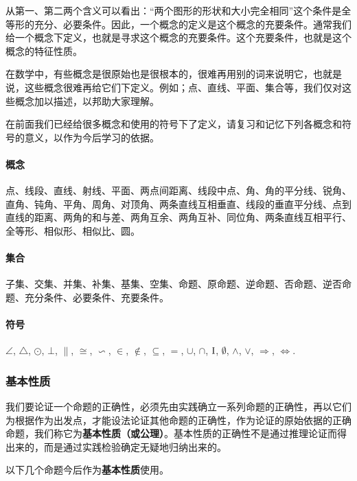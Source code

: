 从第一、第二两个含义可以看出：“两个图形的形状和大小完全相同”这个条件是全等形的充分、必要条件。因此，一个概念的定义是这个概念的充要条件。通常我们给一个概念下定义，也就是寻求这个概念的充要条件。这个充要条件，也就是这个概念的特征性质。

在数学中，有些概念是很原始也是很根本的，很难再用别的词来说明它，也就是说，这些概念很难再给它们下定义。例如；点、直线、平面、集合等，我们仅对这些概念加以描述，以邦助大家理解。

在前面我们已经给很多概念和使用的符号下了定义，请复习和记忆下列各概念和符号的意义，以作为今后学习的依据。

\paragraph{概念} 点、线段、直线、射线、平面、两点间距离、线段中点、角、角的平分线、锐角、直角、钝角、平角、周角、对顶角、两条直线互相垂直、线段的垂直平分线、点到直线的距离、两角的和与差、两角互余、两角互补、同位角、两条直线互相平行、全等形、相似形、相似比、圆。

\paragraph{集合} 子集、交集、并集、补集、基集、空集、命题、原命题、逆命题、否命题、逆否命题、充分条件、必要条件、充要条件。

\paragraph{符号} $\angle$, $\triangle$, $\odot$, $\bot$, $\parallel$, $\cong$, $\backsim$, $\in$, $\notin$, $\subseteq$, $=$, $\cup$, $\cap$, ${\rm I}$, $\emptyset$, $\wedge$, $\vee$, $\Rightarrow$, $\Leftrightarrow$.

\subsubsection{基本性质}

我们要论证一个命题的正确性，必须先由实践确立一系列命题的正确性，再以它们为根据作为出发点，才能设法论证其他命题的正确性，作为论证的原始依据的正确命题，我们称它为\textbf{基本性质（或公理）}。基本性质的正确性不是通过推理论证而得出来的，而是通过实践检验确定无疑地归纳出来的。

以下几个命题今后作为\textbf{基本性质}使用。





























